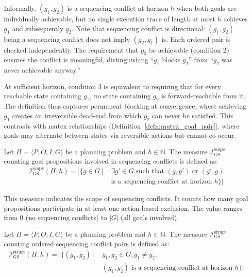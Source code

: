 Informally, $(g_1, g_2)$ is a sequencing conflict at horizon $h$ when both goals are individually achievable, but no single execution trace of length at most $h$ achieves $g_1$ and subsequently $g_2$. Note that sequencing conflict is directional: $(g_1, g_2)$ being a sequencing conflict does not imply $(g_2, g_1)$ is. Each ordered pair is checked independently. The requirement that $g_2$ be achievable (condition 2) ensures the conflict is meaningful, distinguishing ``$g_1$ blocks $g_2$'' from ``$g_2$ was never achievable anyway.''

At sufficient horizon, condition 3 is equivalent to requiring that for every reachable state containing $g_1$, no state containing $g_2$ is forward-reachable from it. The definition thus captures permanent blocking at convergence, where achieving $g_1$ creates an irreversible dead-end from which $g_2$ can never be satisfied. This contrasts with mutex relationships (Definition~\ref{defn:mutex_goal_pair}), where goals may alternate between states via reversible actions but cannot co-occur.

\begin{defn}
    Let $\Pi = \langle P, O, I, G \rangle$ be a planning problem and $h \in \mathbb{N}$. The measure $\mathcal{I}^{\text{scope}}_{\text{GS}}$ counting goal propositions involved in sequencing conflicts is defined as:
    \begin{equation*}
        \begin{aligned}
            \mathcal{I}^{\text{scope}}_{\text{GS}}(\Pi, h) = |\{g \in G \mid {} & \exists g' \in G \text{ such that } (g, g') \text{ or } (g', g) \\
                                                                                & \text{is a sequencing conflict at horizon } h\}|
        \end{aligned}
    \end{equation*}
\end{defn}

This measure indicates the scope of sequencing conflicts. It counts how many goal propositions participate in at least one action-based exclusion. The value ranges from $0$ (no sequencing conflicts) to $|G|$ (all goals involved).

\begin{defn}
    Let $\Pi = \langle P, O, I, G \rangle$ be a planning problem and $h \in \mathbb{N}$. The measure $\mathcal{I}^{\text{struct}}_{\text{GS}}$ counting ordered sequencing conflict pairs is defined as:
    \begin{equation*}
        \begin{aligned}
            \mathcal{I}^{\text{struct}}_{\text{GS}}(\Pi, h) = |\{(g_1, g_2) \mid {} & g_1, g_2 \in G, g_1 \neq g_2,                                \\
                                                                                    & (g_1, g_2) \text{ is a sequencing conflict at horizon } h\}|
        \end{aligned}
    \end{equation*}
\end{defn}

